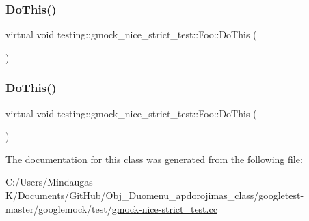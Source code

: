\subsubsection{\texorpdfstring{DoThis()}{DoThis()}\hspace{0.1cm}{\footnotesize\ttfamily [2/3]}}
{\footnotesize\ttfamily virtual void testing\+::gmock\+\_\+nice\+\_\+strict\+\_\+test\+::\+Foo\+::\+Do\+This (\begin{DoxyParamCaption}{ }\end{DoxyParamCaption})\hspace{0.3cm}{\ttfamily [pure virtual]}}

\mbox{\label{classtesting_1_1gmock__nice__strict__test_1_1_foo_a79a3cdbd8d9d9f6bc87580563b0d7cec}} 
\subsubsection{\texorpdfstring{DoThis()}{DoThis()}\hspace{0.1cm}{\footnotesize\ttfamily [3/3]}}
{\footnotesize\ttfamily virtual void testing\+::gmock\+\_\+nice\+\_\+strict\+\_\+test\+::\+Foo\+::\+Do\+This (\begin{DoxyParamCaption}{ }\end{DoxyParamCaption})\hspace{0.3cm}{\ttfamily [pure virtual]}}



The documentation for this class was generated from the following file\+:\begin{DoxyCompactItemize}
\item 
C\+:/\+Users/\+Mindaugas K/\+Documents/\+Git\+Hub/\+Obj\+\_\+\+Duomenu\+\_\+apdorojimas\+\_\+class/googletest-\/master/googlemock/test/\mbox{\hyperlink{googletest-master_2googlemock_2test_2gmock-nice-strict__test_8cc}{gmock-\/nice-\/strict\+\_\+test.\+cc}}\end{DoxyCompactItemize}
